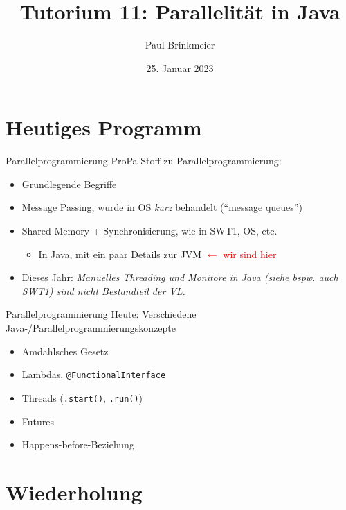 \documentclass{beamer}
\title{Tutorium 11: Parallelität in Java}
\author{Paul Brinkmeier}
\institute{Tutorium Programmierparadigmen am KIT}
\date{25. Januar 2023}
\begin{document}
\begin{frame}
	\titlepage
\end{frame}

\section{Heutiges Programm}

\begin{frame}{Parallelprogrammierung}
	ProPa-Stoff zu Parallelprogrammierung:

	\begin{itemize}
		\item Grundlegende Begriffe
		\item Message Passing, wurde in OS \emph{kurz} behandelt (\enquote{message queues})
		\item Shared Memory + Synchronisierung, wie in SWT1, OS, etc.
		\begin{itemize}
                  \item In Java, mit ein paar Details zur JVM \textcolor{red}{$\leftarrow$ wir sind hier}
		\end{itemize}
              \item Dieses Jahr: \emph{Manuelles Threading und Monitore in Java (siehe bspw. auch SWT1) sind nicht Bestandteil der VL.}
	\end{itemize}
\end{frame}

\begin{frame}{Parallelprogrammierung}
  Heute: Verschiedene Java-/Parallelprogrammierungskonzepte

  \begin{itemize}
    \item Amdahlsches Gesetz
    \item Lambdas, \texttt{@FunctionalInterface}
    \item Threads (\texttt{.start()}, \texttt{.run()})
    \item Futures
    \item Happens-before-Beziehung
  \end{itemize}
\end{frame}

\section{Wiederholung}
\end{document}
